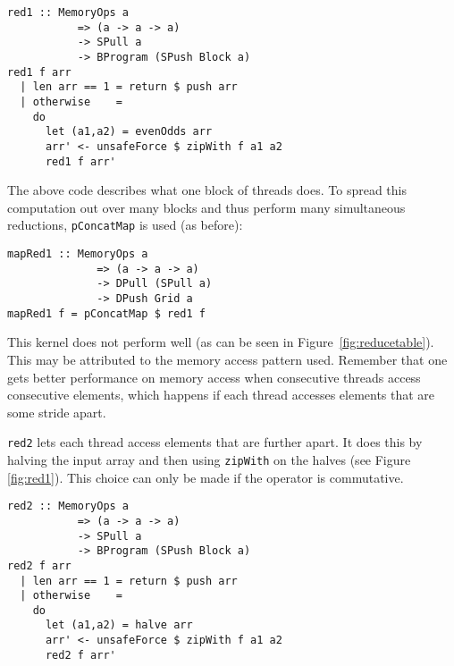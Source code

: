 \begin{small} 
\begin{Verbatim}[samepage = true] 
red1 :: MemoryOps a
           => (a -> a -> a)
           -> SPull a
           -> BProgram (SPush Block a)
red1 f arr
  | len arr == 1 = return $ push arr
  | otherwise    = 
    do
      let (a1,a2) = evenOdds arr
      arr' <- unsafeForce $ zipWith f a1 a2
      red1 f arr'   
\end{Verbatim}
\end{small}

The above code describes what one block of threads does. To spread 
this computation out over many blocks and thus perform many simultaneous 
reductions, {\tt pConcatMap} is used (as before): 

\begin{small} 
\begin{Verbatim}[samepage = true] 
mapRed1 :: MemoryOps a 
              => (a -> a -> a) 
              -> DPull (SPull a) 
              -> DPush Grid a
mapRed1 f = pConcatMap $ red1 f
\end{Verbatim}
\end{small} %

This kernel does not perform well (as can be seen in Figure~\ref{fig:reducetable}). 
This may be attributed to the memory access pattern used. Remember that
one gets better performance on memory access when consecutive threads
access consecutive elements, which happens if
each thread accesses elements that are some stride apart. 


{\tt red2} lets each thread access elements that are further apart. It does 
this by halving the input array and then using {\tt zipWith} on the halves (see Figure~ \ref{fig:red1}). 
This choice can only be made if the operator is commutative.  

\begin{small} 
\begin{Verbatim}[samepage = true] 
red2 :: MemoryOps a
           => (a -> a -> a)
           -> SPull a
           -> BProgram (SPush Block a)
red2 f arr
  | len arr == 1 = return $ push arr
  | otherwise    = 
    do
      let (a1,a2) = halve arr
      arr' <- unsafeForce $ zipWith f a1 a2
      red2 f arr'   
\end{Verbatim}
\end{small}


